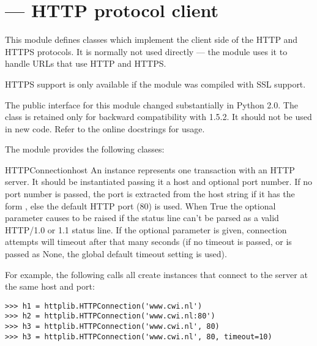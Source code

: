 \section{ ---
         HTTP protocol client}



This module defines classes which implement the client side of the
HTTP and HTTPS protocols.  It is normally not used directly --- the
module  uses it to handle URLs
that use HTTP and HTTPS.

\begin{notice}
  HTTPS support is only available if the  module was
  compiled with SSL support.
\end{notice}

\begin{notice}
  The public interface for this module changed substantially in Python
  2.0.  The  class is retained only for backward
  compatibility with 1.5.2.  It should not be used in new code.  Refer
  to the online docstrings for usage.
\end{notice}

The module provides the following classes:

\begin{classdesc}{HTTPConnection}{host}
An  instance represents one transaction with an HTTP
server.  It should be instantiated passing it a host and optional port number.
If no port number is passed, the port is extracted from the host string if it
has the form , else the default HTTP port (80) is
used.  
When True the optional parameter 
causes  to be raised if the status line can't be parsed
as a valid HTTP/1.0 or 1.1 status line.  If the optional 
parameter is given, connection attempts will timeout after that many
seconds (if no timeout is passed, or is passed as None, the global default 
timeout setting is used).

For example, the following calls all create instances that connect to
the server at the same host and port:

\begin{verbatim}
>>> h1 = httplib.HTTPConnection('www.cwi.nl')
>>> h2 = httplib.HTTPConnection('www.cwi.nl:80')
>>> h3 = httplib.HTTPConnection('www.cwi.nl', 80)
>>> h3 = httplib.HTTPConnection('www.cwi.nl', 80, timeout=10)
\end{verbatim}
\end{classdesc}

